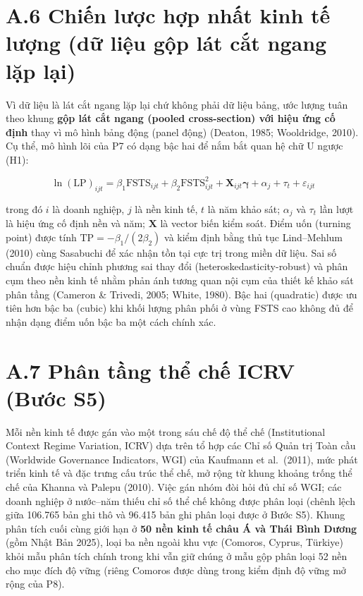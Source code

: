 \documentclass[
  a4paper,
  13pt]{extreport}
\begin{document}
\hypertarget{a.6-chiux1ebfn-lux1b0ux1ee3c-hux1ee3p-nhux1ea5t-kinh-tux1ebf-lux1b0ux1ee3ng-dux1eef-liux1ec7u-gux1ed9p-luxe1t-cux1eaft-ngang-lux1eb7p-lux1ea1i}{%
\section{A.6 Chiến lược hợp nhất kinh tế lượng (dữ liệu gộp lát cắt
ngang lặp
lại)}\label{a.6-chiux1ebfn-lux1b0ux1ee3c-hux1ee3p-nhux1ea5t-kinh-tux1ebf-lux1b0ux1ee3ng-dux1eef-liux1ec7u-gux1ed9p-luxe1t-cux1eaft-ngang-lux1eb7p-lux1ea1i}}

Vì dữ liệu là lát cắt ngang lặp lại chứ không phải dữ liệu bảng, ước
lượng tuân theo khung \textbf{gộp lát cắt ngang (pooled cross-section)
với hiệu ứng cố định} thay vì mô hình bảng động (panel động) (Deaton,
1985; Wooldridge, 2010). Cụ thể, mô hình lõi của P7 có dạng bậc hai để
nắm bắt quan hệ chữ U ngược (H1):

\[\ln(\text{LP})_{ijt} = \beta_1 \text{FSTS}_{ijt} + \beta_2 \text{FSTS}^2_{ijt} + \mathbf{X}_{ijt}\boldsymbol{\gamma} + \alpha_j + \tau_t + \varepsilon_{ijt}\]

trong đó \(i\) là doanh nghiệp, \(j\) là nền kinh tế, \(t\) là năm khảo
sát; \(\alpha_j\) và \(\tau_t\) lần lượt là hiệu ứng cố định nền và năm;
\(\mathbf{X}\) là vector biến kiểm soát. Điểm uốn (turning point) được
tính \(\text{TP} = -\beta_1/(2\beta_2)\) và kiểm định bằng thủ tục
Lind--Mehlum (2010) cùng Sasabuchi để xác nhận tồn tại cực trị trong
miền dữ liệu. Sai số chuẩn được hiệu chỉnh phương sai thay đổi
(heteroskedasticity-robust) và phân cụm theo nền kinh tế nhằm phản ánh
tương quan nội cụm của thiết kế khảo sát phân tầng (Cameron \& Trivedi,
2005; White, 1980). Bậc hai (quadratic) được ưu tiên hơn bậc ba (cubic)
khi khối lượng phân phối ở vùng FSTS cao không đủ để nhận dạng điểm uốn
bậc ba một cách chính xác.

\hypertarget{a.7-phuxe2n-tux1ea7ng-thux1ec3-chux1ebf-icrv-bux1b0ux1edbc-s5}{%
\section{A.7 Phân tầng thể chế ICRV (Bước
S5)}\label{a.7-phuxe2n-tux1ea7ng-thux1ec3-chux1ebf-icrv-bux1b0ux1edbc-s5}}

Mỗi nền kinh tế được gán vào một trong sáu chế độ thể chế (Institutional
Context Regime Variation, ICRV) dựa trên tổ hợp các Chỉ số Quản trị Toàn
cầu (Worldwide Governance Indicators, WGI) của Kaufmann et al.~(2011),
mức phát triển kinh tế và đặc trưng cấu trúc thể chế, mở rộng từ khung
khoảng trống thể chế của Khanna và Palepu (2010). Việc gán nhóm đòi hỏi
đủ chỉ số WGI; các doanh nghiệp ở nước--năm thiếu chỉ số thể chế không
được phân loại (chênh lệch giữa 106.765 bản ghi thô và 96.415 bản ghi
phân loại được ở Bước S5). Khung phân tích cuối cùng giới hạn ở
\textbf{50 nền kinh tế châu Á và Thái Bình Dương} (gồm Nhật Bản 2025),
loại ba nền ngoài khu vực (Comoros, Cyprus, Türkiye) khỏi mẫu phân tích
chính trong khi vẫn giữ chúng ở mẫu gộp phân loại 52 nền cho mục đích độ
vững (riêng Comoros được dùng trong kiểm định độ vững mở rộng của P8).
\end{document}
